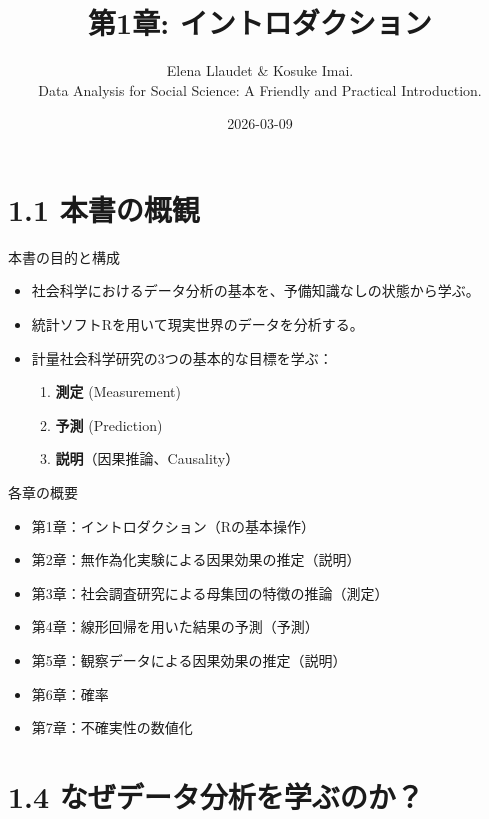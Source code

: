 \documentclass[
  ignorenonframetext,
]{beamer}
\title{第1章: イントロダクション}
\subtitle{Elena Llaudet \& Kosuke Imai.\\
Data Analysis for Social Science: A Friendly and Practical
Introduction.}
\author{}
\date{\vspace{-2.5em}2026-03-09}
\providecommand{\tightlist}{%
  \setlength{\itemsep}{0pt}\setlength{\parskip}{0pt}}
\begin{document}
\frame{\titlepage}

\hypertarget{ux672cux66f8ux306eux6982ux89b3}{%
\section{1.1 本書の概観}\label{ux672cux66f8ux306eux6982ux89b3}}

\begin{frame}{本書の目的と構成}
\protect\hypertarget{ux672cux66f8ux306eux76eeux7684ux3068ux69cbux6210}{}
\begin{itemize}
\tightlist
\item
  社会科学におけるデータ分析の基本を、予備知識なしの状態から学ぶ。
\item
  統計ソフトRを用いて現実世界のデータを分析する。
\item
  計量社会科学研究の3つの基本的な目標を学ぶ：

  \begin{enumerate}
  \tightlist
  \item
    \textbf{測定} (Measurement)
  \item
    \textbf{予測} (Prediction)
  \item
    \textbf{説明}（因果推論、Causality）
  \end{enumerate}
\end{itemize}
\end{frame}

\begin{frame}{各章の概要}
\protect\hypertarget{ux5404ux7ae0ux306eux6982ux8981}{}
\begin{itemize}
\tightlist
\item
  第1章：イントロダクション（Rの基本操作）
\item
  第2章：無作為化実験による因果効果の推定（説明）
\item
  第3章：社会調査研究による母集団の特徴の推論（測定）
\item
  第4章：線形回帰を用いた結果の予測（予測）
\item
  第5章：観察データによる因果効果の推定（説明）
\item
  第6章：確率
\item
  第7章：不確実性の数値化
\end{itemize}
\end{frame}

\hypertarget{ux306aux305cux30c7ux30fcux30bfux5206ux6790ux3092ux5b66ux3076ux306eux304b}{%
\section{1.4
なぜデータ分析を学ぶのか？}\label{ux306aux305cux30c7ux30fcux30bfux5206ux6790ux3092ux5b66ux3076ux306eux304b}}
\end{document}
